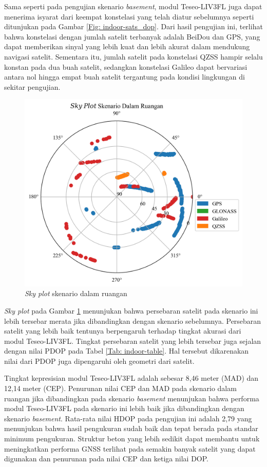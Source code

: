 Sama seperti pada pengujian skenario \textit{basement}, modul Teseo\hyp{}LIV3FL juga dapat menerima isyarat dari keempat konstelasi yang telah diatur sebelumnya seperti ditunjukan pada Gambar \ref{Fig: indoor-sats_dop}. Dari hasil pengujian ini, terlihat bahwa konstelasi dengan jumlah satelit terbanyak adalah BeiDou dan GPS, yang dapat memberikan sinyal yang lebih kuat dan lebih akurat dalam mendukung navigasi satelit. Sementara itu, jumlah satelit pada konstelasi QZSS hampir selalu konstan pada dua buah satelit, sedangkan konstelasi Galileo dapat bervariasi antara nol hingga empat buah satelit tergantung pada kondisi lingkungan di sekitar pengujian. 

\begin{figure}[H]
	\centering
	\captionsetup{justification=centering}
	\includegraphics[width=12cm]{contents/chapter-4/2-skenario-indoor/sky_plot.png}
	\caption{\textit{Sky plot} skenario dalam ruangan}
	\label{Fig: indoor-sky_plot}
\end{figure}

\textit{Sky plot} pada Gambar \ref{Fig: indoor-sky_plot} menunjukan bahwa persebaran satelit pada skenario ini lebih tersebar merata jika dibandingkan dengan skenario sebelumnya. Persebaran satelit yang lebih baik tentunya berpengaruh terhadap tingkat akurasi dari modul Teseo\hyp{}LIV3FL. Tingkat persebaran satelit yang lebih tersebar juga sejalan dengan nilai PDOP pada Tabel \ref{Tab: indoor-table}. Hal tersebut dikarenakan nilai dari PDOP juga dipengaruhi oleh geometri dari satelit.

Tingkat kepresisian modul Teseo\hyp{}LIV3FL adalah sebesar 8,46 meter (MAD) dan 12,14 meter (CEP). Penurunan nilai CEP dan MAD pada skenario dalam ruangan jika dibandingkan pada skenario \textit{basement} menunjukan bahwa performa modul Teseo\hyp{}LIV3FL pada skenario ini lebih baik jika dibandingkan dengan skenario \textit{basement}. Rata-rata nilai HDOP pada pengujian ini adalah 2,79 yang menunjukan bahwa hasil pengukuran sudah baik dan tepat berada pada standar minimum pengukuran. Struktur beton yang lebih sedikit dapat membantu untuk meningkatkan performa GNSS terlihat pada semakin banyak satelit yang dapat digunakan dan penurunan pada nilai CEP dan ketiga nilai DOP.

